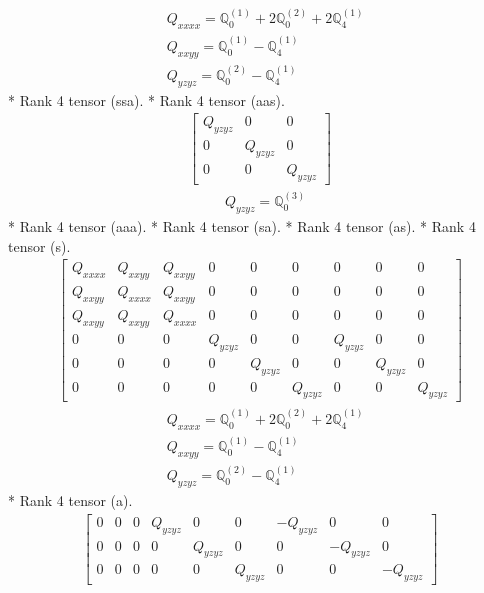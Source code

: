 \documentclass[fleqn,8pt,landscape]{jsarticle}
\begin{document}
\begin{align*}
& Q_{xxxx} = \mathbb{Q}_{0}^{(1)} + 2 \mathbb{Q}_{0}^{(2)} + 2 \mathbb{Q}_{4}^{(1)} \\
& Q_{xxyy} = \mathbb{Q}_{0}^{(1)} - \mathbb{Q}_{4}^{(1)} \\
& Q_{yzyz} = \mathbb{Q}_{0}^{(2)} - \mathbb{Q}_{4}^{(1)}
\end{align*}
* Rank 4 tensor (ssa).
* Rank 4 tensor (aas).
\begin{align*}
\begin{bmatrix} Q_{yzyz} & 0 & 0 \\ 0 & Q_{yzyz} & 0 \\ 0 & 0 & Q_{yzyz} \end{bmatrix}
\end{align*}
\begin{align*}
& Q_{yzyz} = \mathbb{Q}_{0}^{(3)}
\end{align*}
* Rank 4 tensor (aaa).
* Rank 4 tensor (sa).
* Rank 4 tensor (as).
* Rank 4 tensor (s).
\begin{align*}
\begin{bmatrix} Q_{xxxx} & Q_{xxyy} & Q_{xxyy} & 0 & 0 & 0 & 0 & 0 & 0 \\ Q_{xxyy} & Q_{xxxx} & Q_{xxyy} & 0 & 0 & 0 & 0 & 0 & 0 \\ Q_{xxyy} & Q_{xxyy} & Q_{xxxx} & 0 & 0 & 0 & 0 & 0 & 0 \\ 0 & 0 & 0 & Q_{yzyz} & 0 & 0 & Q_{yzyz} & 0 & 0 \\ 0 & 0 & 0 & 0 & Q_{yzyz} & 0 & 0 & Q_{yzyz} & 0 \\ 0 & 0 & 0 & 0 & 0 & Q_{yzyz} & 0 & 0 & Q_{yzyz} \end{bmatrix}
\end{align*}
\begin{align*}
& Q_{xxxx} = \mathbb{Q}_{0}^{(1)} + 2 \mathbb{Q}_{0}^{(2)} + 2 \mathbb{Q}_{4}^{(1)} \\
& Q_{xxyy} = \mathbb{Q}_{0}^{(1)} - \mathbb{Q}_{4}^{(1)} \\
& Q_{yzyz} = \mathbb{Q}_{0}^{(2)} - \mathbb{Q}_{4}^{(1)}
\end{align*}
* Rank 4 tensor (a).
\begin{align*}
\begin{bmatrix} 0 & 0 & 0 & Q_{yzyz} & 0 & 0 & - Q_{yzyz} & 0 & 0 \\ 0 & 0 & 0 & 0 & Q_{yzyz} & 0 & 0 & - Q_{yzyz} & 0 \\ 0 & 0 & 0 & 0 & 0 & Q_{yzyz} & 0 & 0 & - Q_{yzyz} \end{bmatrix}
\end{align*}
\end{document}
